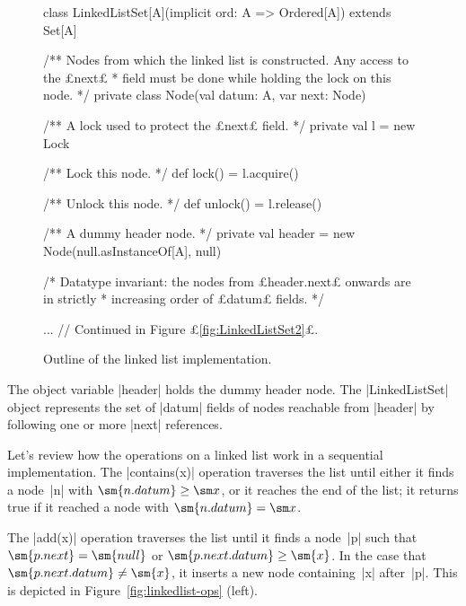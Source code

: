 \begin{figure}
\begin{scala}
class LinkedListSet[A](implicit ord: A => Ordered[A]) extends Set[A]{
  /** Nodes from which the linked list is constructed.  Any access to the £next£ 
    * field must be done while holding the lock on this node.  */
  private class Node(val datum: A, var next: Node){
    /** A lock used to protect the £next£ field. */
    private val l = new Lock

    /** Lock this node. */
    def lock() = l.acquire()

    /** Unlock this node. */
    def unlock() = l.release()
  }

  /** A dummy header node. */
  private val header = new Node(null.asInstanceOf[A], null)

  /* Datatype invariant: the nodes from £header.next£ onwards are in strictly
   * increasing order of £datum£ fields. */ 

  ... // Continued in Figure £\ref{fig:LinkedListSet2}£.
}
\end{scala}
\caption{Outline of the linked list implementation.}
\label{fig:LinkedListSet}
\end{figure}


The object variable |header| holds the
dummy header node.
%
The |LinkedListSet| object represents the set of |datum| fields of nodes
reachable from |header| by following one or more |next| references.

Let's review how the operations on a linked list work in a sequential
implementation.  The |contains(x)| operation traverses the list until either
it finds a node~|n| with $\sm{n.datum} \ge \sm x$, or it reaches the end of
the list; it returns true if it reached a node with $\sm{n.datum} = \sm x$.

The |add(x)| operation traverses the list until it finds a node~|p| such that
$\sm{p.next} = \sm{null}$ or $\sm{p.next.datum} \ge \sm{x}$.  In the case that
$\sm{p.next.datum} \ne \sm{x}$, it inserts a new node containing~|x|
after~|p|.  This is depicted in Figure~\ref{fig:linkedlist-ops} (left).


